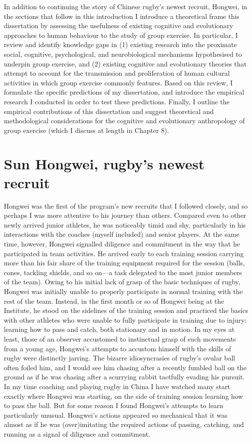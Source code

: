 In addition to continuing the story of Chinese rugby's newest recruit, Hongwei, in the sections that follow in this introduction I introduce a theoretical frame this dissertation by assessing the usefulness of existing cognitive and evolutionary approaches to human behaviour to the study of group exercise. In particular, I review and identify knowledge gaps in (1) existing research into the proximate social, cognitive, psychological, and neurobiological mechanisms hypothesised to underpin group exercise, and (2) existing cognitive and evolutionary theories that attempt to account for the transmission and proliferation of human cultural activities in which group exercise commonly features. Based on this review, I formulate the specific predictions of my dissertation, and introduce the empirical research I conducted in order to test these predictions.  Finally, I outline the empirical contributions of this dissertation and suggest theoretical and methodological considerations for the cognitive and evolutionary anthropology of group exercise (which I discuss at length in Chapter 8).


\section{Sun Hongwei, rugby's newest recruit}
Hongwei was the first of the program’s new recruits that I followed closely, and so perhaps I was more attentive to his journey than others.  Compared even to other newly arrived junior athletes, he was noticeably timid and shy, particularly in his interactions with the coaches (myself included) and senior players.   At the same time, however, Hongwei signalled diligence and commitment in the way that he participated in team activities.  He arrived early to each training session carrying more than his fair share of the training equipment required for the session (balls, cones, tackling shields, and so on---a task delegated to the most junior members of the team). Owing to his initial lack of grasp of the basic techniques of rugby, Hongwei was initially unable to properly participate in normal training with the rest of the team. Instead, in the first month or so of Hongwei being at the Institute, he stood on the sidelines of the training session and practiced the basics with other athletes who were unable to fully participate in training due to injury: learning how to pass and catch, both stationary and in motion. In my eyes at least, those of an observer accustomed to instinctual grasp of such movements from a young age, Hongwei's attempts to accustom himself with the skills of rugby were distinctly jarring.  The bizarre idiosyncrasies of rugby's ovular ball often foiled him, and I would see him chasing after a recently fumbled ball on the ground as if he was chasing after a scurrying rabbit tactfully evading his pursuit.  In my time coaching and playing rugby in China I have watched many start exactly where Hongwei was starting, on the side of training session learning how to pass the ball.  But for some reason I found Hongwei’s attempts to learn particularly unusual.  Hongwei's actions appeared so mechanical that it was almost as if he was (over)imitating the required actions of passing, catching, and running as a signal of diligence and commitment.

